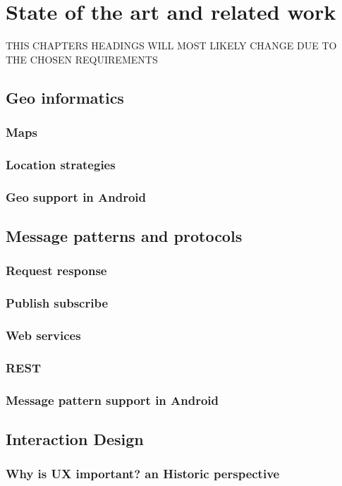 \chapter{State of the art and related work}
\label{chap:theory}
THIS CHAPTERS HEADINGS WILL MOST LIKELY CHANGE DUE TO THE CHOSEN REQUIREMENTS
\section{Geo informatics}
\subsection{Maps}
\subsection{Location strategies}
\subsection{Geo support in Android}

\section{Message patterns and protocols}
\subsection{Request response}
\subsection{Publish subscribe}
\subsection{Web services}
\subsection{REST}
\subsection{Message pattern support in Android}

\section{Interaction Design}
\subsection{Why is UX important? an Historic perspective}
